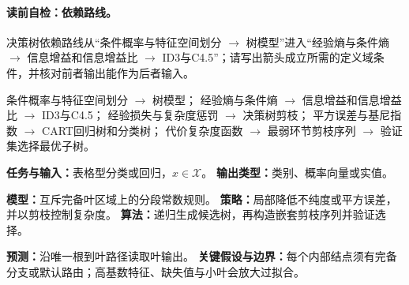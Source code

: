 \label{struct:V2-C04-CH04}
\paragraph{读前自检：依赖路线。}决策树依赖路线从“条件概率与特征空间划分 $\to$ 树模型”进入“经验熵与条件熵 $\to$ 信息增益和信息增益比 $\to$ ID3与C4.5”；请写出箭头成立所需的定义域条件，并核对前者输出能作为后者输入。\par

\begin{dependencybox}
条件概率与特征空间划分 $\to$ 树模型；
经验熵与条件熵 $\to$ 信息增益和信息增益比 $\to$ ID3与C4.5；
经验损失与复杂度惩罚 $\to$ 决策树剪枝；
平方误差与基尼指数 $\to$ CART回归树和分类树；
代价复杂度函数 $\to$ 最弱环节剪枝序列 $\to$ 验证集选择最优子树。
\end{dependencybox}

\begin{keypointbox}[title=模型认识卡：决策树]
\textbf{任务与输入：}表格型分类或回归，$x\in\mathcal X$。\quad
\textbf{输出类型：}类别、概率向量或实值。\par
\textbf{模型：}互斥完备叶区域上的分段常数规则。\quad
\textbf{策略：}局部降低不纯度或平方误差，并以剪枝控制复杂度。\quad
\textbf{算法：}递归生成候选树，再构造嵌套剪枝序列并验证选择。\par
\textbf{预测：}沿唯一根到叶路径读取叶输出。\quad
\textbf{关键假设与边界：}每个内部结点须有完备分支或默认路由；高基数特征、缺失值与小叶会放大过拟合。
\end{keypointbox}

